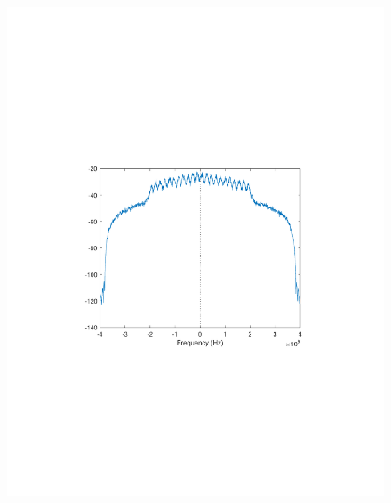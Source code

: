 \begin{refsection}
\begin{figure}[H]
	\centering
	\begin{minipage}{0.30\textwidth}
		\centering
		\includegraphics[clip, trim=4cm 8cm 4cm 8cm, width=1\textwidth]{./sdf/m_qam_system/figures/expResults/homodyne/2_4GBdInSig13dBc_AfMF.pdf}
		\label{fig:4GBdEyeMf}
	\end{minipage}
	\begin{minipage}{0.30\textwidth}
		\centering

\end{minipage}
\end{figure}
\end{refsection}
